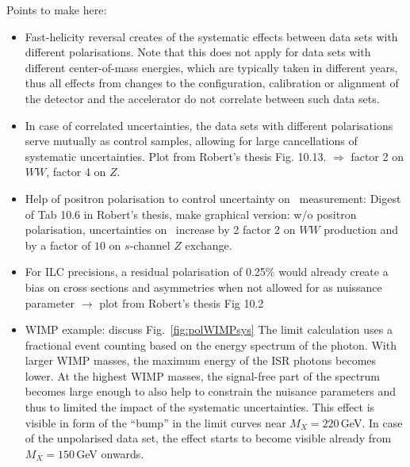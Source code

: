 {\color{blue} Points to make here:
\begin{itemize}
\item Fast-helicity reversal creates of the systematic effects between data sets with different polarisations. Note that this does not apply for data sets with different center-of-mass energies, which are typically taken in different years, thus all effects from changes to the configuration, calibration or alignment of the detector and the accelerator do not correlate between such data sets.
\item In case of correlated uncertainties, the data sets with different polarisations serve mutually as control samples, allowing for large cancellations of systematic uncertainties. Plot from Robert's thesis Fig. 10.13. $\Rightarrow$ factor 2 on $WW$, factor 4 on $Z$.
\item Help of positron polarisation to control uncertainty on \ALR\ measurement: Digest of Tab 10.6 in Robert's thesis, make graphical version: w/o positron polarisation, uncertainties on \ALR\ increase by 2 factor 2 on $WW$ production and by a factor of $10$ on $s$-channel $Z$ exchange.
\item For ILC precisions, a residual polarisation of 0.25\% would already create a bias on cross sections and asymmetries when not allowed for as nuissance parameter $\to$ plot from Robert's thesis Fig 10.2
\item WIMP example: discuss Fig.~\ref{fig:polWIMPsys} The limit calculation uses a fractional event counting based on the 
energy spectrum of the photon. With larger WIMP masses, the maximum energy of the ISR photons becomes lower. At the highest WIMP masses, the signal-free part of the spectrum becomes large enough to also help to constrain the nuisance parameters and thus to limited the impact of the systematic uncertainties. This effect is visible in form of the ``bump'' in the limit curves near $M_X=220$\,GeV. In case of the unpolarised data set, the effect starts to become visible already from $M_X=150$\,GeV onwards. 
\end{itemize}
}


